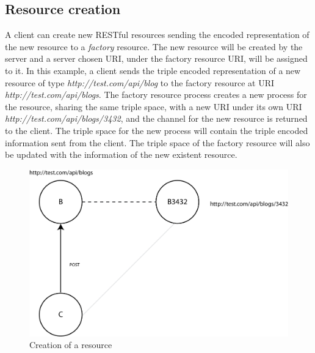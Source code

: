 \subsection{Resource creation}
A client can create new RESTful resources sending the encoded representation of the new resource to a \emph{factory} resource. The new resource will be created by the server and a server chosen URI, under the factory resource URI, will be assigned to it.
In this example, a client sends the triple encoded representation of a new resource of type \emph{http://test.com/api/blog} to the factory resource at URI \emph{http://test.com/api/blogs}. The factory resource process creates a new process for the resource, sharing the same triple space, with a new URI under its own URI \emph{http://test.com/api/blogs/3432}, and the channel for the new resource is returned to the client. The triple space for the new process will contain the triple encoded information sent from the client. The triple space of the factory resource will also be updated with the information of the new existent resource.

\begin{figure}[htb!]
\centering%
\includegraphics{post_ex.png}
\caption{Creation of a resource}
\end{figure}

